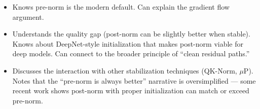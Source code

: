 \begin{interviewq}
\goodgreat
\begin{itemize}
    \item {} Knows pre-norm is the modern default. Can explain the gradient flow argument.
    \item {} Understands the quality gap (post-norm can be slightly better when stable). Knows about DeepNet-style initialization that makes post-norm viable for deep models. Can connect to the broader principle of ``clean residual paths.''
    \item {} Discusses the interaction with other stabilization techniques (QK-Norm, $\mu$P). Notes that the ``pre-norm is always better'' narrative is oversimplified --- some recent work shows post-norm with proper initialization can match or exceed pre-norm.
\end{itemize}

\end{interviewq}

